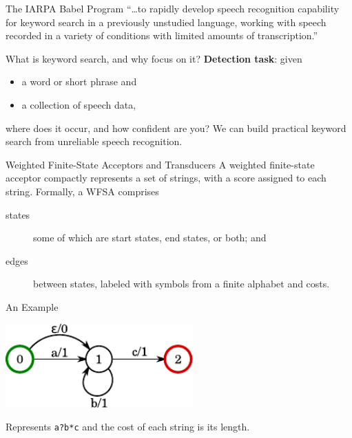 \begin{frame}{The IARPA Babel Program}{}
  \Large{``\ldots to rapidly develop speech recognition
    capability for \alert{keyword search} in a previously unstudied
    language, working with speech recorded in a variety of
    conditions with limited amounts of transcription.''}\par
\end{frame}

\begin{frame}{What is keyword search, and why focus on it?}{}
  {\bf Detection task}: given
    \begin{itemize}
    \item a word or short phrase and
    \item a collection of speech data,
    \end{itemize}
    \alert{where} does it occur, and \alert{how confident} are you?
    \vfill
    We can build \alert{practical} keyword search from
    \alert{unreliable} speech recognition.
\end{frame}

\begin{frame}{Weighted Finite-State Acceptors and Transducers}{}
  A \alert{weighted finite-state acceptor} compactly represents a set
  of strings, with a score assigned to each string.
  \vfill
  Formally, a WFSA comprises
  \begin{description}
  \item[states] some of which are start states, end states, or both;
    and
  \item[edges] between states, labeled with symbols from a finite
    alphabet and costs.
  \end{description}
\end{frame}

\begin{frame}{An Example}{}
  \begin{center}
    \includegraphics[width=72mm]{figures/WFSA}
  \end{center}
  \vfill
  Represents {\tt a?b*c} and the cost of each string is its length.
\end{frame}


